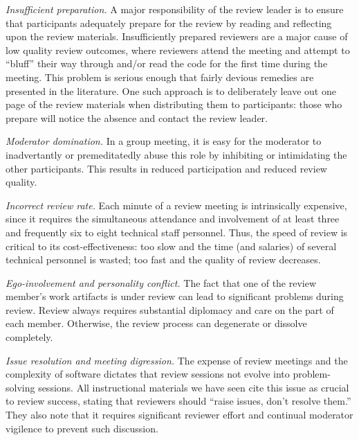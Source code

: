 \begin{itemizenoindent}
\item {\em Insufficient preparation.} A major responsibility of the
  review leader is to ensure that participants adequately prepare for the
  review by reading and reflecting upon the review materials.
  Insufficiently prepared reviewers are a major cause of low quality review
  outcomes, where reviewers attend the meeting and attempt to ``bluff''
  their way through and/or read the code for the first time during the meeting.
  This problem is serious enough that fairly devious remedies are presented
  in the literature. One such approach is to deliberately leave out one
  page of the review materials when distributing them to participants:
  those who prepare will notice the absence and contact the review leader.
  
\item {\em Moderator domination.} In a group meeting, it is easy for the
  moderator to inadvertantly or premeditatedly abuse this role by
  inhibiting or intimidating the other participants.  This results in
  reduced participation and reduced review quality.

\item {\em Incorrect review rate.} Each minute of a review meeting is
  intrinsically expensive, since it requires the simultaneous attendance
  and involvement of at least three and frequently six to eight technical
  staff personnel.  Thus, the speed of review is critical to its
  cost-effectiveness: too slow and the time (and salaries) of several
  technical personnel is wasted; too fast and the quality of review
  decreases.

\item {\em Ego-involvement and personality conflict.} The fact that one of
  the review member's work artifacts is under review can lead to
  significant problems during review.  Review always requires substantial
  diplomacy and care on the part of each member.  Otherwise, the review
  process can degenerate or dissolve completely.

\item {\em Issue resolution and meeting digression.} The expense of
  review meetings and the complexity of software dictates that review
  sessions not evolve into problem-solving sessions.  All instructional
  materials we have seen cite this issue as crucial to review success,
  stating that reviewers should ``raise issues, don't resolve them.''  They
  also note that it requires significant reviewer effort and continual
  moderator vigilence to prevent such discussion.
  

\end{itemizenoindent}
